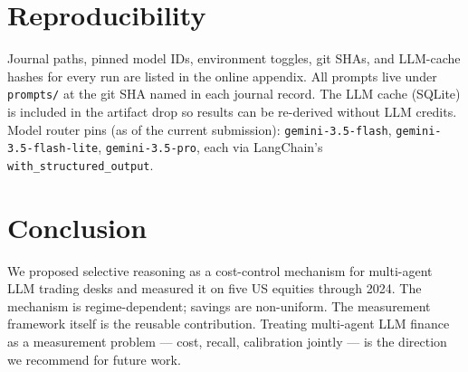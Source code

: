 \documentclass[conference]{IEEEtran}
\begin{document}
\section{Reproducibility}
\label{sec:repro}

Journal paths, pinned model IDs, environment toggles, git SHAs, and
LLM-cache hashes for every run are listed in the online appendix.
All prompts live under \texttt{prompts/} at the git SHA named in
each journal record. The LLM cache (SQLite) is included in the
artifact drop so results can be re-derived without LLM credits.
Model router pins (as of the current submission):
\texttt{gemini-3.5-flash}, \texttt{gemini-3.5-flash-lite},
\texttt{gemini-3.5-pro}, each via LangChain's \texttt{with\_structured\_output}.

\section{Conclusion}

We proposed selective reasoning as a cost-control mechanism for
multi-agent LLM trading desks and measured it on five US equities
through 2024. The mechanism is regime-dependent; savings are
non-uniform. The measurement framework itself is the reusable
contribution. Treating multi-agent LLM finance as a measurement
problem --- cost, recall, calibration jointly --- is the direction
we recommend for future work.
\end{document}
